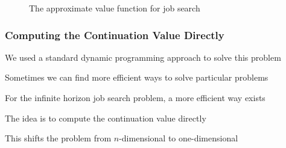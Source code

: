 \begin{frame}

    \begin{figure}
        \centering
        \caption{\label{f:iid_job_search_3} The approximate value function for job
        search}
    \end{figure}

\end{frame}


\begin{frame}
    \frametitle{Computing the Continuation Value Directly}

    We used a standard dynamic programming approach to solve this problem

    Sometimes we can find more efficient ways to solve particular problems

    For the infinite horizon job search problem, a more efficient way exists

    The idea is to compute the continuation value directly

    This shifts the problem from $n$-dimensional to one-dimensional

\end{frame}


